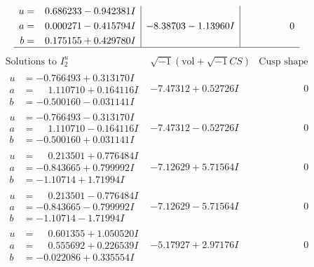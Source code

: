 \documentclass[1p]{elsarticle_modified}
\theoremstyle{definition}
\newcommand{\I}{\sqrt{-1}}
\begin{document}
$$\begin{array}{c|c|c}
\begin{aligned}
u &= \phantom{-}0.686233 - 0.942381 I \\
a &= \phantom{-}0.000271 - 0.415794 I \\
b &= \phantom{-}0.175155 + 0.429780 I\end{aligned}
 & -8.38703 - 1.13960 I & \phantom{-0.000000 } 0\\
 \hline 
 \end{array}$$\newpage$$\begin{array}{c|c|c}  
\text{Solutions to }I^u_{2}& \I (\text{vol} + \sqrt{-1}CS) & \text{Cusp shape}\\
 \hline 
\begin{aligned}
u &= -0.766493 + 0.313170 I \\
a &= \phantom{-}1.110710 + 0.164116 I \\
b &= -0.500160 - 0.031141 I\end{aligned}
 & -7.47312 + 0.52726 I & \phantom{-0.000000 } 0 \\ \hline\begin{aligned}
u &= -0.766493 - 0.313170 I \\
a &= \phantom{-}1.110710 - 0.164116 I \\
b &= -0.500160 + 0.031141 I\end{aligned}
 & -7.47312 - 0.52726 I & \phantom{-0.000000 } 0 \\ \hline\begin{aligned}
u &= \phantom{-}0.213501 + 0.776484 I \\
a &= -0.843665 + 0.799992 I \\
b &= -1.10714 + 1.71994 I\end{aligned}
 & -7.12629 + 5.71564 I & \phantom{-0.000000 } 0 \\ \hline\begin{aligned}
u &= \phantom{-}0.213501 - 0.776484 I \\
a &= -0.843665 - 0.799992 I \\
b &= -1.10714 - 1.71994 I\end{aligned}
 & -7.12629 - 5.71564 I & \phantom{-0.000000 } 0 \\ \hline\begin{aligned}
u &= \phantom{-}0.601355 + 1.050520 I \\
a &= \phantom{-}0.555692 + 0.226539 I \\
b &= -0.022086 + 0.335554 I\end{aligned}
 & -5.17927 + 2.97176 I & \phantom{-0.000000 } 0 \\ \hline\begin{aligned}

\end{aligned}
\end{array}$$
\end{document}
